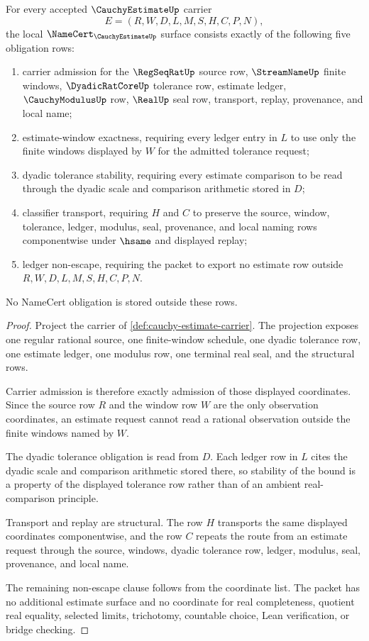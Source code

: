 \begin{theorem}\label{thm:cauchy-estimate-namecert-obligations}
For every accepted $\CauchyEstimateUp$ carrier
$$
E=(R,W,D,L,M,S,H,C,P,N),
$$
the local $\NameCert_{\CauchyEstimateUp}$ surface consists exactly of the following five obligation rows:
\begin{enumerate}
\item carrier admission for the $\RegSeqRatUp$ source row, $\StreamNameUp$ finite windows, $\DyadicRatCoreUp$ tolerance row, estimate ledger, $\CauchyModulusUp$ row, $\RealUp$ seal row, transport, replay, provenance, and local name;
\item estimate-window exactness, requiring every ledger entry in $L$ to use only the finite windows displayed by $W$ for the admitted tolerance request;
\item dyadic tolerance stability, requiring every estimate comparison to be read through the dyadic scale and comparison arithmetic stored in $D$;
\item classifier transport, requiring $H$ and $C$ to preserve the source, window, tolerance, ledger, modulus, seal, provenance, and local naming rows componentwise under $\hsame$ and displayed replay;
\item ledger non-escape, requiring the packet to export no estimate row outside $R,W,D,L,M,S,H,C,P,N$.
\end{enumerate}
No NameCert obligation is stored outside these rows.
\end{theorem}
\begin{proof}
Project the carrier of \autoref{def:cauchy-estimate-carrier}. The projection exposes one regular rational source, one finite-window schedule, one dyadic tolerance row, one estimate ledger, one modulus row, one terminal real seal, and the structural rows.

Carrier admission is therefore exactly admission of those displayed coordinates. Since the source row $R$ and the window row $W$ are the only observation coordinates, an estimate request cannot read a rational observation outside the finite windows named by $W$.

The dyadic tolerance obligation is read from $D$. Each ledger row in $L$ cites the dyadic scale and comparison arithmetic stored there, so stability of the bound is a property of the displayed tolerance row rather than of an ambient real-comparison principle.

Transport and replay are structural. The row $H$ transports the same displayed coordinates componentwise, and the row $C$ repeats the route from an estimate request through the source, windows, dyadic tolerance row, ledger, modulus, seal, provenance, and local name.

The remaining non-escape clause follows from the coordinate list. The packet has no additional estimate surface and no coordinate for real completeness, quotient real equality, selected limits, trichotomy, countable choice, Lean verification, or bridge checking.
\end{proof}

